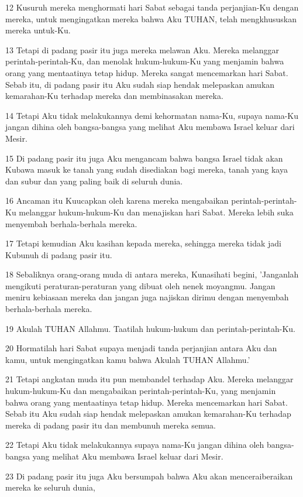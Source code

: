 \par 12 Kusuruh mereka menghormati hari Sabat sebagai tanda perjanjian-Ku dengan mereka, untuk mengingatkan mereka bahwa Aku TUHAN, telah mengkhususkan mereka untuk-Ku.
\par 13 Tetapi di padang pasir itu juga mereka melawan Aku. Mereka melanggar perintah-perintah-Ku, dan menolak hukum-hukum-Ku yang menjamin bahwa orang yang mentaatinya tetap hidup. Mereka sangat mencemarkan hari Sabat. Sebab itu, di padang pasir itu Aku sudah siap hendak melepaskan amukan kemarahan-Ku terhadap mereka dan membinasakan mereka.
\par 14 Tetapi Aku tidak melakukannya demi kehormatan nama-Ku, supaya nama-Ku jangan dihina oleh bangsa-bangsa yang melihat Aku membawa Israel keluar dari Mesir.
\par 15 Di padang pasir itu juga Aku mengancam bahwa bangsa Israel tidak akan Kubawa masuk ke tanah yang sudah disediakan bagi mereka, tanah yang kaya dan subur dan yang paling baik di seluruh dunia.
\par 16 Ancaman itu Kuucapkan oleh karena mereka mengabaikan perintah-perintah-Ku melanggar hukum-hukum-Ku dan menajiskan hari Sabat. Mereka lebih suka menyembah berhala-berhala mereka.
\par 17 Tetapi kemudian Aku kasihan kepada mereka, sehingga mereka tidak jadi Kubunuh di padang pasir itu.
\par 18 Sebaliknya orang-orang muda di antara mereka, Kunasihati begini, 'Janganlah mengikuti peraturan-peraturan yang dibuat oleh nenek moyangmu. Jangan meniru kebiasaan mereka dan jangan juga najiskan dirimu dengan menyembah berhala-berhala mereka.
\par 19 Akulah TUHAN Allahmu. Taatilah hukum-hukum dan perintah-perintah-Ku.
\par 20 Hormatilah hari Sabat supaya menjadi tanda perjanjian antara Aku dan kamu, untuk mengingatkan kamu bahwa Akulah TUHAN Allahmu.'
\par 21 Tetapi angkatan muda itu pun membandel terhadap Aku. Mereka melanggar hukum-hukum-Ku dan mengabaikan perintah-perintah-Ku, yang menjamin bahwa orang yang mentaatinya tetap hidup. Mereka mencemarkan hari Sabat. Sebab itu Aku sudah siap hendak melepaskan amukan kemarahan-Ku terhadap mereka di padang pasir itu dan membunuh mereka semua.
\par 22 Tetapi Aku tidak melakukannya supaya nama-Ku jangan dihina oleh bangsa-bangsa yang melihat Aku membawa Israel keluar dari Mesir.
\par 23 Di padang pasir itu juga Aku bersumpah bahwa Aku akan menceraiberaikan mereka ke seluruh dunia,
